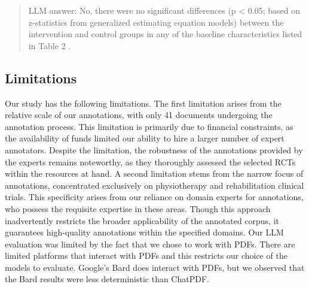 \documentclass[sn-mathphys,Numbered]{sn-jnl}%
\theoremstyle{thmstyleone}%
\theoremstyle{thmstyletwo}%
\theoremstyle{thmstylethree}%
\begin{document}
\begin{quote}
    LLM answer: No, there were no significant differences (p < 0.05; based on z-statistics from generalized estimating equation models) between the intervention and control groups in any of the baseline characteristics listed in Table 2 .
\end{quote}







%
%
%
\subsection{Limitations}
\label{subsec:limits}
%
Our study has the following limitations.
The first limitation arises from the relative scale of our annotations, with only 41 documents undergoing the annotation process.
This limitation is primarily due to financial constraints, as the availability of funds limited our ability to hire a larger number of expert annotators.
Despite the limitation, the robustness of the annotations provided by the experts remains noteworthy, as they thoroughly assessed the selected RCTs within the resources at hand.
A second limitation stems from the narrow focus of annotations, concentrated exclusively on physiotherapy and rehabilitation clinical trials.
This specificity arises from our reliance on domain experts for annotations, who possess the requisite expertise in these areas.
Though this approach inadvertently restricts the broader applicability of the annotated corpus, it guarantees high-quality annotations within the specified domains.
Our LLM evaluation was limited by the fact that we chose to work with PDFs. 
There are limited platforms that interact with PDFs and this restricts our choice of the models to evaluate.
Google's Bard does interact with PDFs, but we observed that the Bard results were less deterministic than ChatPDF.
%
%
%
\end{document}
